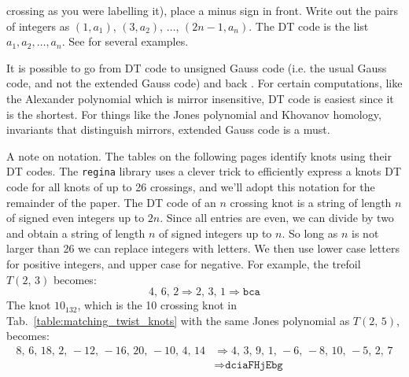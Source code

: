 \documentclass{article}
\theoremstyle{plain}
\begin{document}
        crossing as you were labelling it), place a minus sign in front. Write
        out the pairs of integers as $(1,a_{1})$, $(3,a_{2})$, $\dots$,
        $(2n-1,a_{n})$. The DT code is the list $a_{1},a_{2},\dots,a_{n}$.
        See \cite{KatlasDTCode} for several examples.
        \par\hfill\par
        It is possible to go from DT code to unsigned
        Gauss code (i.e. the usual Gauss code, and not the extended Gauss code)
        and back \cite{KatlasDTCode}. For certain computations,
        like the Alexander polynomial which
        is mirror insensitive, DT code is easiest since it is the shortest.
        For things like the Jones polynomial and Khovanov homology, invariants
        that distinguish mirrors, extended Gauss code is a must.
        \par\hfill\par
        A note on notation. The tables on the following pages identify knots using their DT
        codes. The \texttt{regina} library \cite{regina} uses a clever trick to efficiently
        express a knots DT code for all knots of up to 26 crossings, and we'll
        adopt this notation for the remainder of the paper. The DT code of an
        $n$ crossing knot is a string of length $n$ of signed even integers up
        to $2n$. Since all entries are even, we can divide by two and obtain
        a string of length $n$ of signed integers up to $n$. So long as $n$ is
        not larger than 26 we can replace integers with letters. We then use
        lower case letters for positive integers, and upper case for negative.
        For example, the trefoil $T(2,\,3)$ becomes:
        \begin{equation}
            4,\,6,\,2
            \Rightarrow
            2,\,3,\,1
            \Rightarrow
            \texttt{bca}
        \end{equation}
        The knot $10_{132}$, which is the 10 crossing knot in
        Tab.~\ref{table:matching_twist_knots} with the same Jones polynomial
        as $T(2,\,5)$, becomes:
        \begin{align}
            8,\,6,\,18,\,2,\,-12,\,-16,\,20,\,-10,\,4,\,14
            &\Rightarrow
            4,\,3,\,9,\,1,\,-6,\,-8,\,10,\,-5,\,2,\,7\\
            &\Rightarrow
            \texttt{dciaFHjEbg}
        \end{align}
\end{document}
